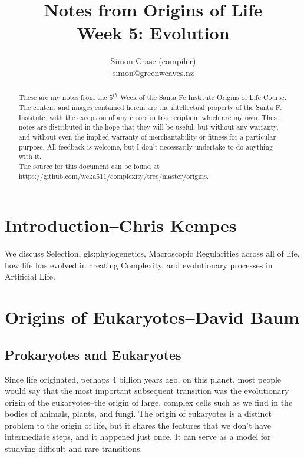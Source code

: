 \documentclass[]{article}
\title{
	Notes from Origins of Life\\
	Week 5: Evolution}
\author{Simon Crase (compiler)\\simon@greenweaves.nz}
\begin{document}
\maketitle

\begin{abstract}
   These are my notes from the $5^{th}$ Week of the Santa Fe Institute Origins of Life Course\cite{sfi2020}. 
   The content and images contained herein are the intellectual property of the Santa Fe Institute, with the exception of any errors in transcription, which are my own.
   These notes are distributed in the hope that they will be useful,
   but without any warranty, and without even the implied warranty of
   merchantability or fitness for a particular purpose. All feedback is welcome,
   but I don't necessarily undertake to do anything with it.\\
   The source for this document can be found at\\
   \url{https://github.com/weka511/complexity/tree/master/origins}.
\end{abstract}

\setcounter{tocdepth}{2}
\tableofcontents
\listoffigures

\section[Introduction]{Introduction--Chris Kempes}

We discuss Selection, \gls{gls:phylogenetics}, Macroscopic Regularities across all of life, how  life has evolved in creating Complexity, and evolutionary processes in Artificial Life. 

\section[Origins of Eukaryotes]{Origins of Eukaryotes--David Baum}

\subsection{Prokaryotes and Eukaryotes}

Since life originated, perhaps 4 billion years ago, on this planet, most people would say that the most important subsequent transition was the evolutionary origin of the eukaryotes--the origin of large, complex cells such as we find in the bodies of animals, plants, and fungi. The origin of eukaryotes is a distinct problem to the origin of life, but it shares the features that we don't have intermediate steps, and it happened just once. It can serve as a model for studying difficult and rare transitions.
\end{document}
